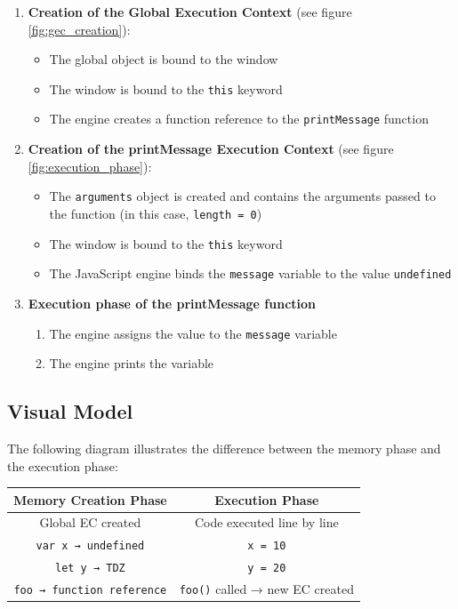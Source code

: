 \documentclass{scrbook}
\begin{document}
\begin{enumerate}
    \item
    \textbf{Creation of the Global Execution Context} (see figure \ref{fig:gec_creation}):
    \begin{itemize}
        \item The global object is bound to the window
        \item The window is bound to the \texttt{this} keyword
        \item The engine creates a function reference to the \texttt{printMessage} function
    \end{itemize}

    \item
    \textbf{Creation of the printMessage Execution Context} (see figure \ref{fig:execution_phase}):
    \begin{itemize}
        \item The \texttt{arguments} object is created and contains the arguments passed to the function (in this case, \texttt{length = 0})
        \item The window is bound to the \texttt{this} keyword
        \item The JavaScript engine binds the \texttt{message} variable to the value \texttt{undefined}
    \end{itemize}

    \item
    \textbf{Execution phase of the printMessage function}
    \begin{enumerate}[label=(\arabic*)]
        \item The engine assigns the value to the \texttt{message} variable
        \item The engine prints the variable
    \end{enumerate}
\end{enumerate}

\subsection{Visual Model}

The following diagram illustrates the difference between the memory phase and the execution phase:

\begin{center}
    \begin{tabular}{|c|c|}
        \hline
        \textbf{Memory Creation Phase} & \textbf{Execution Phase} \\
        \hline
        Global EC created & Code executed line by line \\
        \hline
        \texttt{var x → undefined} & \texttt{x = 10} \\
        \hline
        \texttt{let y → TDZ} & \texttt{y = 20} \\
        \hline
        \texttt{foo → function reference} & \texttt{foo()} called → new EC created \\
        \hline
    \end{tabular}
\end{center}
\end{document}
